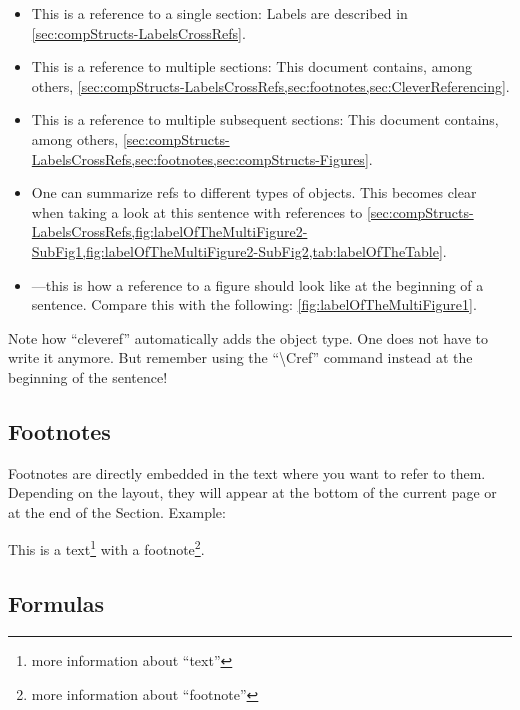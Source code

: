 \begin{itemize}
  \item This is a reference to a single section: Labels are described
in \cref{sec:compStructs-LabelsCrossRefs}.
  \item This is a reference to multiple sections: This document
contains, among others,
\cref{sec:compStructs-LabelsCrossRefs,sec:footnotes,sec:CleverReferencing}.
  \item This is a reference to multiple subsequent sections: This
document contains, among others,
\cref{sec:compStructs-LabelsCrossRefs,sec:footnotes,sec:compStructs-Figures}.
  \item One can summarize refs to different types of objects. This
becomes clear when taking a look at this sentence with references to
\cref{sec:compStructs-LabelsCrossRefs,fig:labelOfTheMultiFigure2-SubFig1,fig:labelOfTheMultiFigure2-SubFig2,tab:labelOfTheTable}.
  \item {}---this is how a reference to a figure
    should look like at the beginning of a sentence.
    Compare this with the following: \cref{fig:labelOfTheMultiFigure1}.
\end{itemize}

Note how ``cleveref'' automatically adds the object type. One does not
have to write it anymore.
But remember using the ``\textbackslash{}Cref'' command instead
at the beginning of the sentence!

\subsection{Footnotes}\label{sec:footnotes}

Footnotes are directly embedded in the text where you want to refer to
them.
Depending on the layout, they will appear at the bottom of the current
page or
at the end of the Section. Example:

This is a text\footnote{more information about ``text''} with a
footnote\footnote{more information about ``footnote''}.


\subsection{Formulas}

